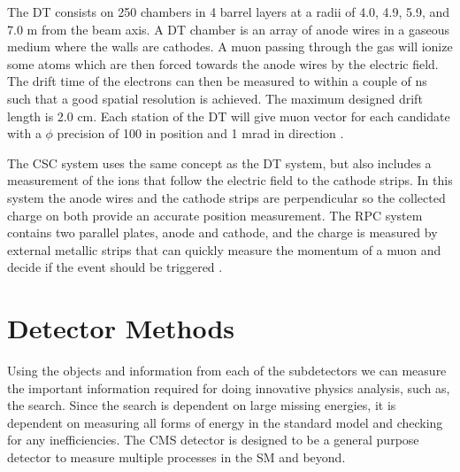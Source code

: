 The DT consists on 250 chambers in 4 barrel layers at a radii of 4.0, 4.9, 5.9, and 7.0 m from the beam axis. A DT chamber is an array of anode wires in a gaseous medium where the walls are cathodes. A muon passing through the gas will ionize some atoms which are then forced towards the anode wires by the electric field. The drift time of the electrons can then be measured to within a couple of ns such that a good spatial resolution is achieved. The maximum designed drift length is 2.0 cm. Each station of the DT will give muon vector for each candidate with a $\phi$ precision of 100 \mum{} in position and 1 mrad in direction \cite{collaboration_cms_2007}. 

The CSC system uses the same concept as the DT system, but also includes a measurement of the ions that follow the electric field to the cathode strips. In this system the anode wires and the cathode strips are perpendicular so the collected charge on both provide an accurate position measurement. The RPC system contains two parallel plates, anode and cathode, and the charge is measured by external metallic strips that can quickly measure the momentum of a muon and decide if the event should be triggered \cite{collaboration_cms_2007}.

\section{Detector Methods}
\label{sec:DetMethods}



Using the objects and information from each of the subdetectors we can measure the important information required for doing innovative physics analysis, such as, the \st{} search. Since the search is dependent on large missing energies, it is dependent on measuring all forms of energy in the standard model and checking for any inefficiencies. The CMS detector is designed to be a general purpose detector to measure multiple processes in the SM and beyond. 